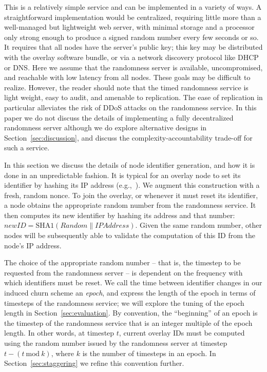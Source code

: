 \documentclass[10pt,twocolumn]{article}
\begin{document}
This is a relatively simple service and  can be implemented in
a variety of ways.  A straightforward implementation would be centralized,
requiring little more than a well-managed but lightweight web server, with minimal storage
and a processor only strong enough to produce a signed random number
every few seconds or so.  It requires that all nodes have the
server's public key; this key may be distributed with the overlay software bundle, or 
via a network discovery protocol like DHCP or DNS. Here we assume that the randomness
server is available, uncompromised, and reachable with low latency
from all nodes.  These goals may be difficult to realize.  However, the reader should note
that the timed randomness service is light weight, easy to audit, and amenable to replication.
The ease of replication in particular alleviates the risk of DDoS attacks on the 
randomness service. In this paper we do not discuss the details of implementing a 
fully decentralized randomness server although we do explore alternative designs in
Section~\ref{sec:discussion}, and discuss the complexity-accountability trade-off for such a service.

\label{sec:identifiers}

In this section we discuss the details of node identifier generation, and how it is done
in an unpredictable fashion.  It is typical for an overlay node to set its
identifier by hashing its IP address
(e.g.,~\cite{Stoica2003}).   We augment this construction with a
fresh, random nonce. To join the
overlay, or whenever it must reset its identifier, a node obtains the
appropriate random number from the randomness service.  It then computes
its new identifier by hashing its address and that number: $\mathit{newID} =
\mathrm{SHA1}(\mathit{Random} \| \mathit{IPAddress})$.  Given the
same random number, 
other nodes will be subsequently able to validate the computation of
this ID from the node's IP address.

The choice of the appropriate random number -- that is, the timestep
to be requested from the randomness server -- is dependent on the
frequency with which identifiers must be reset.  We call the time
between identifier changes in our induced churn scheme an
\emph{epoch}, and express the length of the epoch in terms of timesteps
of the randomness service; we will explore the tuning of the
epoch length in Section~\ref{sec:evaluation}.  By convention,
the ``beginning'' of an epoch is the timestep of the randomness
service that is an integer multiple of the epoch length.  In other
words, at timestep $t$, current overlay IDs must be computed
using the random number issued by the randomness server at timestep
$t - (t \mathrm{\ mod\ } k)$, where $k$ is the number of timesteps
in an epoch. In Section~\ref{sec:staggering} we
refine this convention further.
\end{document}
